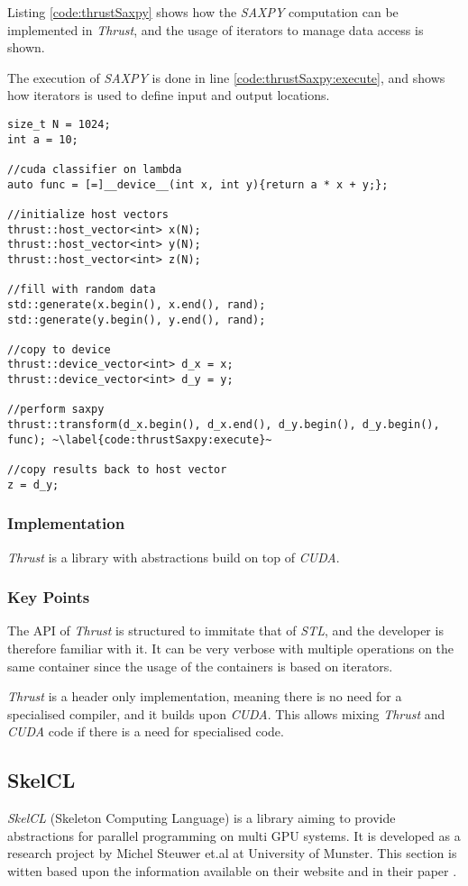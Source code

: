 Listing \ref{code:thrustSaxpy} shows how the \textit{SAXPY} computation can be implemented in \textit{Thrust}, and the usage of iterators to manage data access is shown.

The execution of \textit{SAXPY} is done in line \ref{code:thrustSaxpy:execute}, and shows how iterators is used to define input and output locations.
\begin{lstlisting}[caption={\textit{Thrust} \textit{SAXPY} example.}, label={code:thrustSaxpy}]
size_t N = 1024;
int a = 10;

//cuda classifier on lambda
auto func = [=]__device__(int x, int y){return a * x + y;};

//initialize host vectors
thrust::host_vector<int> x(N);
thrust::host_vector<int> y(N);
thrust::host_vector<int> z(N);

//fill with random data
std::generate(x.begin(), x.end(), rand);
std::generate(y.begin(), y.end(), rand);

//copy to device
thrust::device_vector<int> d_x = x;
thrust::device_vector<int> d_y = y;

//perform saxpy
thrust::transform(d_x.begin(), d_x.end(), d_y.begin(), d_y.begin(), func); ~\label{code:thrustSaxpy:execute}~

//copy results back to host vector
z = d_y;
\end{lstlisting}

\subsubsection{Implementation}
\textit{Thrust} is a library with abstractions build on top of \textit{CUDA}.

\subsubsection{Key Points}
The API of \textit{Thrust} is structured to immitate that of \textit{STL}, and the developer is therefore familiar with it. It can be very verbose with multiple operations on the same container since the usage of the containers is based on iterators.

\textit{Thrust} is a header only implementation, meaning there is no need for a specialised compiler, and it builds upon \textit{CUDA}. This allows mixing \textit{Thrust} and \textit{CUDA} code if there is a need for specialised code.


\subsection{SkelCL}
\textit{SkelCL} (Skeleton Computing Language) is a library aiming to provide abstractions for parallel programming on multi GPU systems. It is developed as a research project by Michel Steuwer et.al at University of Munster. This section is witten based upon the information available on their website \cite{skelclWebsite} and in their paper \cite{skelclPaper}.

